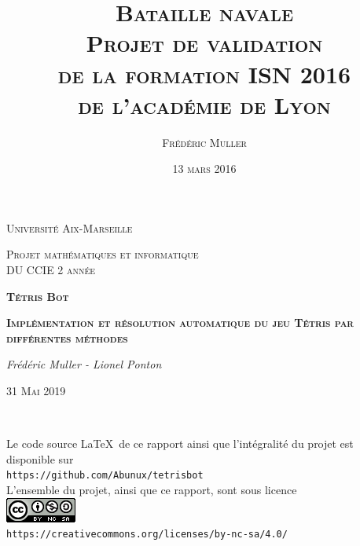 \title{\Huge{\textsc{Bataille navale}}\\ \medskip \medskip\medskip\medskip \large{\textsc{Projet de validation\\de la formation ISN 2016\\de l'académie de Lyon}}}


\author{\textsc{Frédéric Muller}}
\date{\vfill \textsc{13 mars 2016}} 

\pagestyle{empty}

\begin{titlepage}
	\centering
	{\scshape\LARGE Université Aix-Marseille \par}
	\vspace{1cm}
	{\scshape\Large Projet mathématiques et informatique\\DU CCIE 2 année\par}
	\vspace{2.5cm}
	{\Huge\bfseries\scshape Tétris Bot\par}
	\vspace{0.4cm}
	{\Large\bfseries\scshape Implémentation et résolution automatique du jeu Tétris par différentes méthodes\par}
	\vspace{2.5cm}
	{\Large\itshape Frédéric Muller - Lionel Ponton\par}
	\medskip	


	\vfill

	{\scshape\large 31 Mai 2019\par}
\end{titlepage}



\newpage
\ \\
\vfill

\begin{center}
Le code source \LaTeX\ de ce rapport ainsi que l'intégralité du projet est disponible sur \\ \medskip
\texttt{https://github.com/Abunux/tetrisbot}\\ 
\vfill
L'ensemble du projet, ainsi que ce rapport, sont sous licence\\ \medskip
\includegraphics[scale=1]{./media/CC-Logo.png}\\
\texttt{https://creativecommons.org/licenses/by-nc-sa/4.0/}
\end{center}

